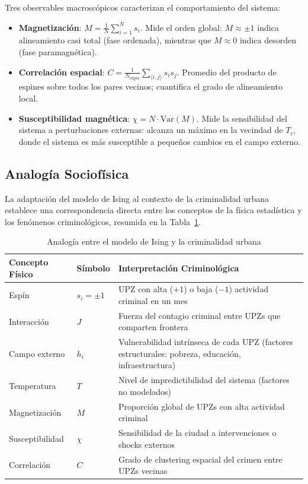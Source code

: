 \documentclass[12pt,a4paper]{article}
\begin{document}
Tres observables macroscópicos caracterizan el comportamiento del sistema:

\begin{itemize}
    \item \textbf{Magnetización}: $M = \frac{1}{N}\sum_{i=1}^{N} s_i$. Mide el orden global: $M \approx \pm 1$ indica alineamiento casi total (fase ordenada), mientras que $M \approx 0$ indica desorden (fase paramagnética).
    \item \textbf{Correlación espacial}: $C = \frac{1}{N_{\text{edges}}}\sum_{\langle i,j \rangle} s_i s_j$. Promedio del producto de espines sobre todos los pares vecinos; cuantifica el grado de alineamiento local.
    \item \textbf{Susceptibilidad magnética}: $\chi = N \cdot \text{Var}(M)$. Mide la sensibilidad del sistema a perturbaciones externas: alcanza un máximo en la vecindad de $T_c$, donde el sistema es más susceptible a pequeños cambios en el campo externo.
\end{itemize}

\subsection{Analogía Sociofísica}

La adaptación del modelo de Ising al contexto de la criminalidad urbana~\cite{castellano2009,prieto2020} establece una correspondencia directa entre los conceptos de la física estadística y los fenómenos criminológicos, resumida en la Tabla~\ref{tab:analogia}.

\begin{table}[H]
\centering
\caption{Analogía entre el modelo de Ising y la criminalidad urbana}
\label{tab:analogia}
\begin{tabular}{@{}p{2.5cm}p{1.8cm}p{9.5cm}@{}}
\toprule
\textbf{Concepto Físico} & \textbf{Símbolo} & \textbf{Interpretación Criminológica} \\
\midrule
Espín & $s_i = \pm 1$ & UPZ con alta ($+1$) o baja ($-1$) actividad criminal en un mes \\
Interacción & $J$ & Fuerza del contagio criminal entre UPZs que comparten frontera \\
Campo externo & $h_i$ & Vulnerabilidad intrínseca de cada UPZ (factores estructurales: pobreza, educación, infraestructura) \\
Temperatura & $T$ & Nivel de impredictibilidad del sistema (factores no modelados) \\
Magnetización & $M$ & Proporción global de UPZs con alta actividad criminal \\
Susceptibilidad & $\chi$ & Sensibilidad de la ciudad a intervenciones o shocks externos \\
Correlación & $C$ & Grado de clustering espacial del crimen entre UPZs vecinas \\
\bottomrule
\end{tabular}
\end{table}
\end{document}
